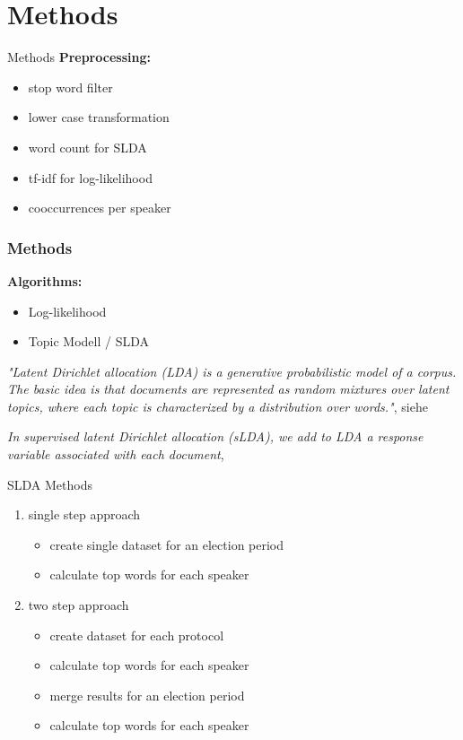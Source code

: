 \documentclass[11pt, a4paper]{beamer}
\begin{document}
\section{Methods} 
\begin{frame}{Methods}
\textbf{Preprocessing:}
\begin{itemize}
\item stop word filter
\item lower case transformation
\item word count for SLDA
\item tf-idf for log-likelihood
\item cooccurrences per speaker
\end{itemize}
\end{frame}

\begin{frame}
\frametitle{Methods}
\textbf{Algorithms:}
\begin{itemize}
\item Log-likelihood
\item Topic Modell / SLDA
\end{itemize}
\textit {"Latent Dirichlet allocation (LDA) is a generative probabilistic
	model of a corpus. The basic idea is that documents are represented as
 	random mixtures over latent topics, where each topic is characterized by a
 	distribution over words."}, siehe \cite{blatent}
%  	

\textit{In supervised latent Dirichlet allocation (sLDA), we add to LDA a response variable associated with each document}, \cite{BleiSupervisedTopicModels}
\end{frame}

\begin{frame}{SLDA Methods}
\begin{enumerate}
\item single step approach
\begin{itemize}
\item create single dataset for an election period
\item calculate top words for each speaker
\end{itemize}
\item two step approach
\begin{itemize}
\item create dataset for each protocol
\item calculate top words for each speaker
\item merge results for an election period
\item calculate top words for each speaker
\end{itemize}
\end{enumerate}
\end{frame}
\end{document}

